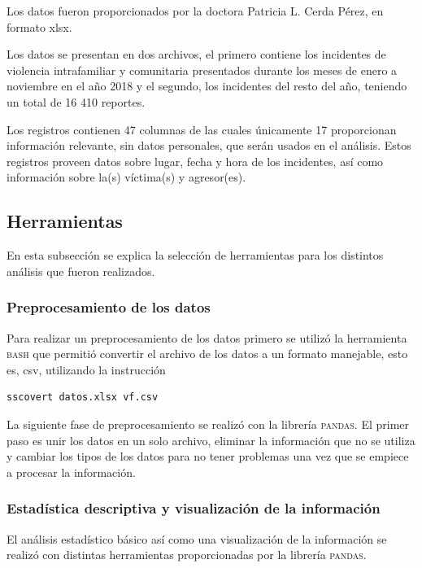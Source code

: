 \documentclass[final,5p,times]{elsarticle}
\begin{document}
Los datos fueron proporcionados por la doctora Patricia L. Cerda P\'erez, en formato xlsx.

Los datos se presentan en dos archivos, el primero contiene los incidentes de violencia intrafamiliar y comunitaria presentados durante los meses de enero a noviembre en el a\~no 2018 y el segundo, los incidentes del resto del a\~no, teniendo un total de 16 410 reportes. 

Los registros contienen 47 columnas de las cuales \'unicamente 17 proporcionan informaci\'on relevante, sin datos personales, que ser\'an usados en el an\'alisis. Estos registros proveen datos sobre lugar, fecha y hora de los incidentes, as\'i como informaci\'on sobre la(s) v\'ictima(s) y agresor(es).  

\subsection{Herramientas}

En esta subsecci\'on se explica la selecci\'on de herramientas para los distintos an\'alisis que fueron realizados.

\subsubsection*{Preprocesamiento de los datos} 
Para realizar un preprocesamiento de los datos primero se utiliz\'o la herramienta \textsc{bash} que permiti\'o convertir el archivo de los datos a un formato manejable, esto es, csv, utilizando la instrucci\'on
\begin{lstlisting}
sscovert datos.xlsx vf.csv
\end{lstlisting}

La siguiente fase de preprocesamiento se realiz\'o con la librer\'ia \textsc{pandas}. El primer paso es unir los datos en un solo archivo, eliminar la informaci\'on que no se utiliza y cambiar los tipos de los datos para no tener problemas una vez que se empiece a procesar la informaci\'on.

\subsubsection*{Estad\'istica descriptiva y visualizaci\'on de la informaci\'on}

El an\'alisis estad\'istico b\'asico as\'i como una visualizaci\'on de la informaci\'on se realiz\'o con distintas herramientas proporcionadas por la librer\'ia \textsc{pandas}.
\end{document}
